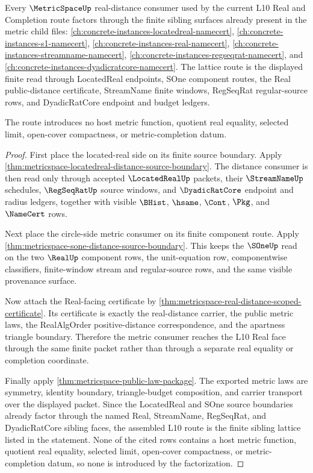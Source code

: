 \begin{theorem}
\label{thm:metricspace-l10-sibling-lattice-route}
Every $\MetricSpaceUp$ real-distance consumer used by the current L10 Real
and Completion route factors through the finite sibling surfaces already
present in the metric child files:
\autoref{ch:concrete-instances-locatedreal-namecert},
\autoref{ch:concrete-instances-s1-namecert},
\autoref{ch:concrete-instances-real-namecert},
\autoref{ch:concrete-instances-streamname-namecert},
\autoref{ch:concrete-instances-regseqrat-namecert}, and
\autoref{ch:concrete-instances-dyadicratcore-namecert}. The lattice route is
the displayed finite read through LocatedReal endpoints, SOne component
routes, the Real public-distance certificate, StreamName finite windows,
RegSeqRat regular-source rows, and DyadicRatCore endpoint and budget ledgers.

The route introduces no host metric function, quotient real equality,
selected limit, open-cover compactness, or metric-completion datum.
\end{theorem}
\begin{proof}
First place the located-real side on its finite source boundary. Apply
\autoref{thm:metricspace-locatedreal-distance-source-boundary}. The distance
consumer is then read only through accepted $\LocatedRealUp$ packets, their
$\StreamNameUp$ schedules, $\RegSeqRatUp$ source windows, and
$\DyadicRatCore$ endpoint and radius ledgers, together with visible
$\BHist$, $\hsame$, $\Cont$, $\Pkg$, and $\NameCert$ rows.

Next place the circle-side metric consumer on its finite component route.
Apply \autoref{thm:metricspace-sone-distance-source-boundary}. This keeps the
$\SOneUp$ read on the two $\RealUp$ component rows, the unit-equation row,
componentwise classifiers, finite-window stream and regular-source rows, and
the same visible provenance surface.

Now attach the Real-facing certificate by
\autoref{thm:metricspace-real-distance-scoped-certificate}. Its certificate
is exactly the real-distance carrier, the public metric laws, the
RealAlgOrder positive-distance correspondence, and the apartness triangle
boundary. Therefore the metric consumer reaches the L10 Real face through the
same finite packet rather than through a separate real equality or completion
coordinate.

Finally apply \autoref{thm:metricspace-public-law-package}. The exported
metric laws are symmetry, identity boundary, triangle-budget composition, and
carrier transport over the displayed packet. Since the LocatedReal and SOne
source boundaries already factor through the named Real, StreamName,
RegSeqRat, and DyadicRatCore sibling faces, the assembled L10 route is the
finite sibling lattice listed in the statement. None of the cited rows
contains a host metric function, quotient real equality, selected limit,
open-cover compactness, or metric-completion datum, so none is introduced by
the factorization.
\end{proof}
